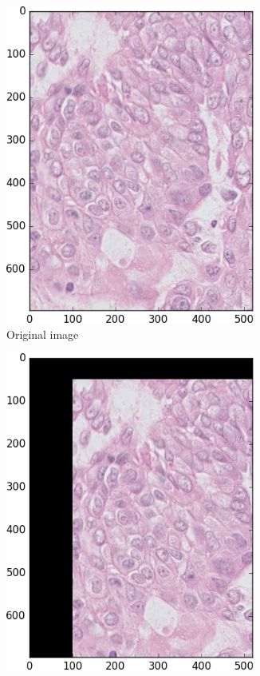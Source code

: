 \documentclass[a4paper,10pt]{article}
\begin{document}
\begin{figure}
\begin{multicols}{3}
	\begin{subfigure}{0.3\textwidth}
    \includegraphics[width=0.9\textwidth]{BIS.png}\par 
     \caption{Original image}
     \label{fig:original}
	\end{subfigure}%
	\begin{subfigure}{0.3\textwidth}
    \includegraphics[width=0.9\textwidth]{shift.png}\par 

\end{subfigure}
\end{multicols}
\end{figure}
\end{document}
